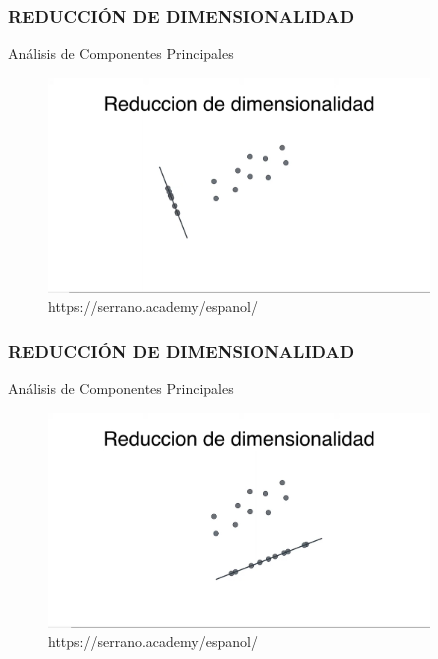 \documentclass{beamer}
\begin{document}
\begin{frame}
	\frametitle{REDUCCIÓN DE DIMENSIONALIDAD}
	\begin{block}{Análisis de Componentes Principales}	
		\begin{figure}
			\includegraphics[width=0.9\textwidth]{PCA/IMG_3531.jpg}
			\caption{https://serrano.academy/espanol/}
		\end{figure}
	\end{block}
\end{frame}

\begin{frame}
	\frametitle{REDUCCIÓN DE DIMENSIONALIDAD}
	\begin{block}{Análisis de Componentes Principales}	
		\begin{figure}
			\includegraphics[width=0.9\textwidth]{PCA/IMG_3532.jpg}
			\caption{https://serrano.academy/espanol/}
		\end{figure}
	\end{block}
\end{frame}
\end{document}
